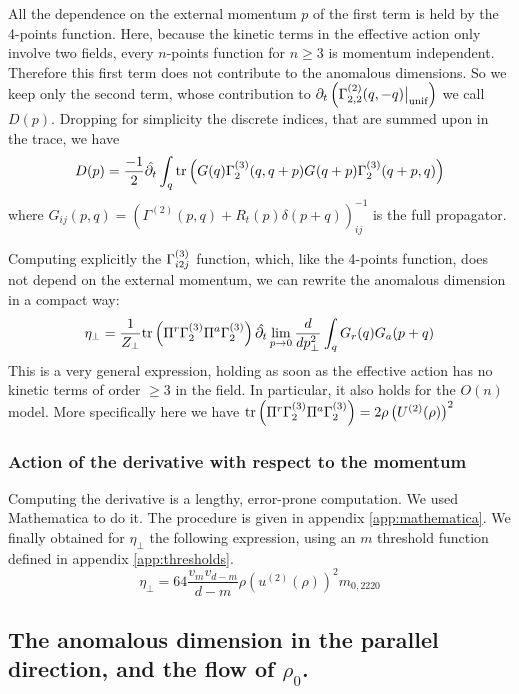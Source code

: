 All the dependence on the external momentum $p$ of the first term is held by the 4-points function. Here, because the kinetic terms in the effective action only involve two fields, every $n$-points function for $n \geq 3$ is momentum independent. Therefore this first term does not contribute to the anomalous dimensions.
So we keep only the second term, whose contribution to $\partial_{t} \left ( \Gamma^{(2)}_{2,2}(q,-q)  \big|_{\text{unif}}  \right )$  we call $D(p)$. Dropping for simplicity the discrete indices, that are summed upon in the trace, we have
\begin{equation}
D(p) = \frac{-1}{2} \hat{\partial_{t}} \int_q  \text{tr}\left( G(q)\Gamma^{(3)}_{2}(q, q + p) G_{}(q + p) \Gamma^{(3)}_{2}(q + p, q) \right) 
\end{equation}
where $G_{ij}(p,q) = \left ( \Gamma^{(2)}(p,q) + R_t(p)\delta(p+q) \right )^{-1}_{ij}$ is the full propagator.

Computing explicitly the $\Gamma^{(3)}_{i2j}$ function, which, like the 4-points function, does not depend on the external momentum, we can rewrite the anomalous dimension in a compact way:
\begin{align}
\eta_\perp = \frac{1}{Z_\perp}  \text{tr}\left(\Pi^r\Gamma^{(3)}_{2} \Pi^a \Gamma^{(3)}_{2}\right)  \hat{\partial_{t}} \lim_{p \rightarrow 0} \frac{d}{dp^2_\perp} \int_q G_r(q) G_a(p+q)
\end{align}
This is a very general expression, holding as soon as the effective action has no kinetic terms of order $\geq 3$ in the field. In particular, it also holds for the $O(n)$ model.
More specifically here we have $ \text{tr}\left(\Pi^r\Gamma^{(3)}_{2} \Pi^a \Gamma^{(3)}_{2}\right)  = 2 \rho \left ( U^{(2)}(\rho) \right )^2$

\subsubsection{Action of the derivative with respect to the momentum}
Computing the derivative is a lengthy, error-prone computation. We used Mathematica to do it. The procedure is given in appendix \ref{app:mathematica}.
We finally obtained for $\eta_\perp$ the following expression, using an $m$ threshold function defined in appendix \ref{app:thresholds}.
\begin{equation}
\label{eq:flow_perp}
\eta_\perp = 64 \frac{v_m v_{d-m}}{d-m} \rho \left( u^{(2)}(\rho) \right)^2 m_{0,2220}
\end{equation}

\subsection{The anomalous dimension in the parallel direction, and the flow of $\rho_0$.}

